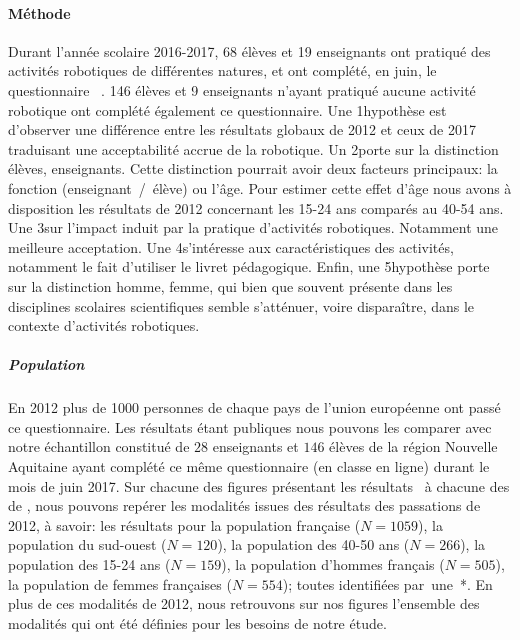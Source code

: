         \paragraph{Méthode}
            Durant l'année scolaire 2016-2017, 68 élèves et 19 enseignants ont pratiqué des activités robotiques de différentes natures, et ont complété, en juin, le questionnaire ~. 146 élèves et 9 enseignants n'ayant pratiqué aucune activité robotique ont complété également ce questionnaire.
            Une 1\iere hypothèse est d'observer une différence entre les résultats globaux de 2012 et ceux de 2017 traduisant une acceptabilité accrue de la robotique.
            Un 2\ieme porte sur la distinction élèves, enseignants. Cette distinction pourrait avoir deux facteurs principaux: la fonction (enseignant~/~élève) ou l'âge. Pour estimer cette effet d'âge nous avons à disposition les résultats de 2012 concernant les 15-24 ans comparés au 40-54 ans.
            Une 3\ieme sur l'impact induit par la pratique d'activités robotiques. Notamment une meilleure acceptation.
            Une 4\ieme s'intéresse aux caractéristiques des activités, notamment le fait d'utiliser le livret pédagogique.
            Enfin, une 5\ieme hypothèse porte sur la distinction homme, femme, qui bien que souvent présente dans les disciplines scolaires scientifiques semble s'atténuer, voire disparaître, dans le contexte d'activités robotiques.
            \subparagraph{Population}
                En 2012 plus de 1000 personnes de chaque pays de l'union européenne ont passé ce questionnaire. Les résultats étant publiques nous pouvons les comparer avec notre échantillon constitué de $28$ enseignants et $146$ élèves de la région Nouvelle Aquitaine ayant complété ce même questionnaire (en classe \etou en ligne) durant le mois de juin 2017.
                Sur chacune des figures présentant les résultats~ à chacune des  de , nous pouvons repérer les modalités issues des résultats des passations de 2012, à savoir: les résultats pour la population française ($N=1059$), la population du sud-ouest ($N=120$), la population des 40-50 ans ($N=266$), la population des 15-24 ans ($N=159$), la population d'hommes français ($N=505$), la population de femmes françaises ($N=554$); toutes identifiées par~une~*. En plus de ces modalités de 2012, nous retrouvons sur nos figures l'ensemble des modalités qui ont été définies pour les besoins de notre étude. %
